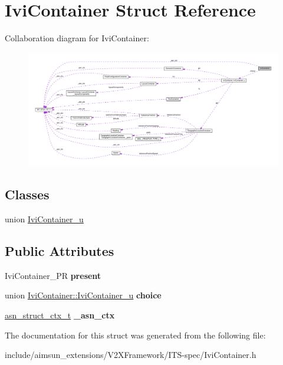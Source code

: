\hypertarget{structIviContainer}{}\section{Ivi\+Container Struct Reference}
\label{structIviContainer}


Collaboration diagram for Ivi\+Container\+:\nopagebreak
\begin{figure}[H]
\begin{center}
\leavevmode
\includegraphics[width=350pt]{structIviContainer__coll__graph}
\end{center}
\end{figure}
\subsection*{Classes}
\begin{DoxyCompactItemize}
\item 
union \hyperlink{unionIviContainer_1_1IviContainer__u}{Ivi\+Container\+\_\+u}
\end{DoxyCompactItemize}
\subsection*{Public Attributes}
\begin{DoxyCompactItemize}
\item 
Ivi\+Container\+\_\+\+PR {\bfseries present}\hypertarget{structIviContainer_ac8d216aeae4bf9b4a9c764d044025abf}{}\label{structIviContainer_ac8d216aeae4bf9b4a9c764d044025abf}

\item 
union \hyperlink{unionIviContainer_1_1IviContainer__u}{Ivi\+Container\+::\+Ivi\+Container\+\_\+u} {\bfseries choice}\hypertarget{structIviContainer_ad45c0917aeffe3f7e244a7dfb7f9d21b}{}\label{structIviContainer_ad45c0917aeffe3f7e244a7dfb7f9d21b}

\item 
\hyperlink{structasn__struct__ctx__s}{asn\+\_\+struct\+\_\+ctx\+\_\+t} {\bfseries \+\_\+asn\+\_\+ctx}\hypertarget{structIviContainer_adb6e4664cf64ca76dfc3f150f4988297}{}\label{structIviContainer_adb6e4664cf64ca76dfc3f150f4988297}

\end{DoxyCompactItemize}


The documentation for this struct was generated from the following file\+:\begin{DoxyCompactItemize}
\item 
include/aimsun\+\_\+extensions/\+V2\+X\+Framework/\+I\+T\+S-\/spec/Ivi\+Container.\+h\end{DoxyCompactItemize}
